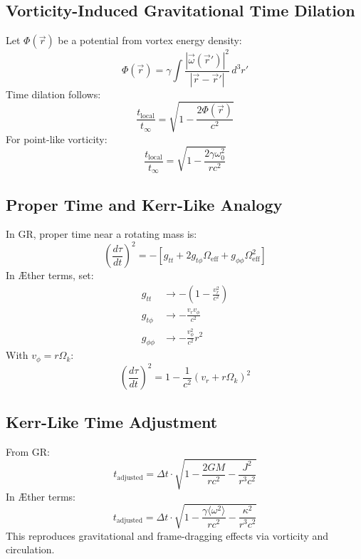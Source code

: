     \subsection{Vorticity-Induced Gravitational Time Dilation}
    Let $\Phi(\vec{r})$ be a potential from vortex energy density:
    \begin{equation}
        \Phi(\vec{r}) = \gamma \int \frac{|\vec{\omega}(\vec{r}')|^2}{|\vec{r} - \vec{r}'|} \, d^3r'
    \end{equation}
    Time dilation follows:
    \begin{equation}
        \frac{t_{\text{local}}}{t_{\infty}} = \sqrt{1 - \frac{2\Phi(\vec{r})}{c^2}}
    \end{equation}
    For point-like vorticity:
    \begin{equation}
        \frac{t_{\text{local}}}{t_{\infty}} = \sqrt{1 - \frac{2\gamma \omega_0^2}{r c^2}}
    \end{equation}

    \subsection{Proper Time and Kerr-Like Analogy}
    In GR, proper time near a rotating mass is:
    \begin{equation}
        \left(\frac{d\tau}{dt}\right)^2 = -\left[g_{tt} + 2 g_{t\phi}\Omega_{\text{eff}} + g_{\phi\phi}\Omega_{\text{eff}}^2\right]
    \end{equation}
    In Æther terms, set:
    \begin{align*}
        g_{tt} &\rightarrow -\left(1 - \frac{v_r^2}{c^2}\right) \\
        g_{t\phi} &\rightarrow -\frac{v_r v_\phi}{c^2} \\
        g_{\phi\phi} &\rightarrow -\frac{v_\phi^2}{c^2} r^2
    \end{align*}
    With $v_\phi = r\Omega_k$:
    \begin{equation}
        \left(\frac{d\tau}{dt}\right)^2 = 1 - \frac{1}{c^2}(v_r + r\Omega_k)^2
    \end{equation}

    \subsection{Kerr-Like Time Adjustment}
    From GR:
    \begin{equation}
        t_{\text{adjusted}} = \Delta t \cdot \sqrt{1 - \frac{2GM}{rc^2} - \frac{J^2}{r^3 c^2}}
    \end{equation}
    In Æther terms:
    \begin{equation}
        \boxed{t_{\text{adjusted}} = \Delta t \cdot \sqrt{1 - \frac{\gamma \langle \omega^2 \rangle}{r c^2} - \frac{\kappa^2}{r^3 c^2}}}
    \end{equation}
    This reproduces gravitational and frame-dragging effects via vorticity and circulation.

